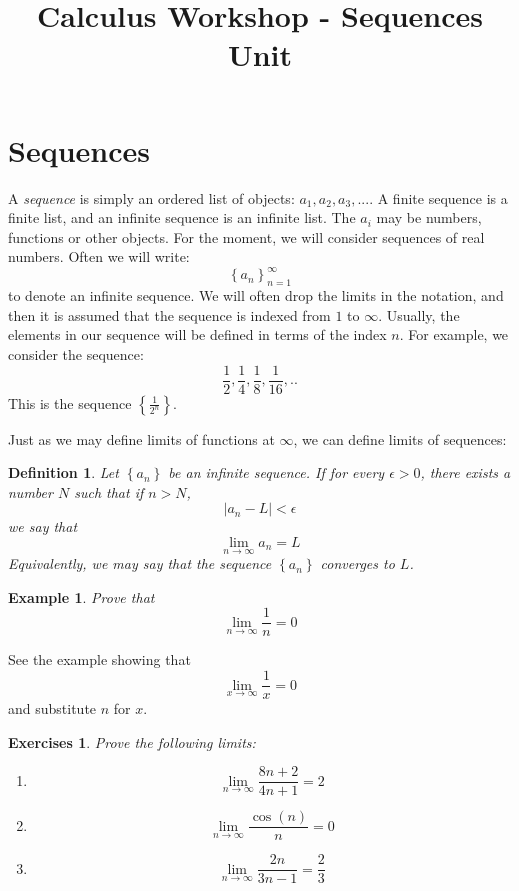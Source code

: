 \documentclass[12pt,a4paper]{article} %
\title{Calculus Workshop - Sequences Unit}
\newtheorem{defn}{Definition}
\newtheorem{example}{Example}
\newtheorem{exer}{Exercises}
\begin{document}
\maketitle

\section{Sequences}
A \emph{sequence} is simply an ordered list of objects: $a_1,a_2,a_3,...$.  A finite sequence is a finite list, and an infinite sequence is an infinite list.  The $a_i$ may be numbers, functions or other objects.  For the moment, we will consider sequences of real numbers.  Often we will write:
\begin{equation}
\left\{a_n\right\}_{n=1}^\infty
\end{equation}
to denote an infinite sequence.  We will often drop the limits in the notation, and then it is assumed that the sequence is indexed from $1$ to $\infty$.  Usually, the elements in our sequence will be defined in terms of the index $n$.  For example, we consider the sequence:
$$\frac12, \frac14,\frac1{8},\frac1{16},.. $$
This is the sequence $\left\{\frac{1}{2^n}\right\}$.  

Just as we may define limits of functions at $\infty$, we can define limits of sequences:
\begin{defn}
Let $\left\{a_n\right\}$ be an infinite sequence.  If for every $\epsilon>0$, there exists a number $N$ such that if $n>N$,
\begin{equation*}
|a_n - L|<\epsilon
\end{equation*}
we say that 
\begin{equation*}
\lim_{n\rightarrow\infty} a_n = L
\end{equation*}
Equivalently, we may say that the sequence $\left\{a_n\right\}$ \emph{converges} to $L$.
\end{defn}
\begin{example}
Prove that $$\lim_{n\rightarrow\infty} \frac1n = 0$$
\end{example}
See the example showing that $$\lim_{x\rightarrow\infty}\frac1x =0$$ and substitute $n$ for $x$.
\begin{exer}
Prove the following limits:
\begin{enumerate}
\item $$\lim_{n\rightarrow\infty} \frac{8n+2}{4n+1} = 2$$
\item $$\lim_{n\rightarrow\infty} \frac{\cos(n)}{n} = 0$$
\item $$\lim_{n\rightarrow\infty} \frac{2n}{3n-1} = \frac23$$
\end{enumerate}
\end{exer}
\end{document}
